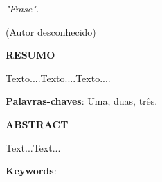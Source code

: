 



\newpage
\thispagestyle{empty}
%

\newpage
\thispagestyle{empty}
%


%
\newpage
\thispagestyle{empty}
\vspace*{20cm}
    \hspace{.45\textwidth} %
   \begin{minipage}{.5\textwidth}
   \onehalfspacing 
   \textit{"Frase".}\\[1cm]
\begin{flushright}
(Autor desconhecido)
\end{flushright}
  \end{minipage}
\newpage %
\thispagestyle{empty}
\begin{center}
\textbf{RESUMO}
\end{center}
\vspace{1cm}

\noindent Texto....Texto....Texto....



\vspace{1cm}
\noindent \textbf{Palavras-chaves}: Uma, duas, três. 
\newpage %
\thispagestyle{empty}
\begin{center}
\textbf{ABSTRACT} 
\end{center}
\vspace{1cm}

\noindent Text...Text...


\vspace{1cm}
\noindent \textbf{Keywords}:

\newpage
\thispagestyle{empty}
\begin{spacing}{1.5}
\listoffigures
\end{spacing}
\thispagestyle{empty}
\newpage
\clearpage
\thispagestyle{empty}
\pagestyle{empty} %
\cleardoublepage
\begin{spacing}{1.5}
\tableofcontents
\end{spacing}
\clearpage
\cleardoublepage
\pagestyle{myheadings}
\markright{}  
\newpage

\newpage


